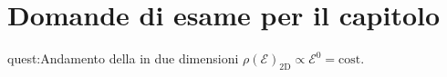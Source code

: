\clearpage
\section*{Domande di esame per il capitolo}%
\begin{quest}{quest:Andamento della in due dimensioni}
    $\rho (\mathcal{E}) _\text{2D} \propto  \mathcal{E}^0 = \text{cost}$.
\end{quest}

